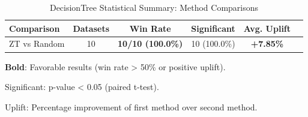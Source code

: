 \begin{table}[htbp]
\centering
\caption{DecisionTree Statistical Summary: Method Comparisons}
\label{tab:decisiontree_stats_summary}
\begin{tabular}{lccccc}
\toprule
Comparison & Datasets & Win Rate & Significant & Avg. Uplift \\
\midrule
ZT vs Random & 10 & \textbf{10/10 (100.0\%)} & 10 (100.0\%) & \textbf{+7.85\%} \\
\bottomrule
\end{tabular}
\begin{tablenotes}
\small
\item \textbf{Bold}: Favorable results (win rate > 50\% or positive uplift).
\item Significant: p-value < 0.05 (paired t-test).
\item Uplift: Percentage improvement of first method over second method.
\end{tablenotes}
\end{table}